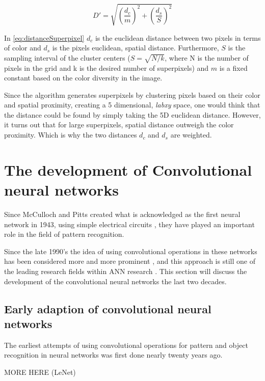 \begin{equation}
	D'=\sqrt{\left(\frac{d_{c}}{m}\right)^{2} + \left(\frac{d_{s}}{S}\right)^{2}}
	\label{eq:distanceSuperpixel}
\end{equation}

In \autoref{eq:distanceSuperpixel} $d_{c}$ is the euclidean distance between two pixels in terms of color and $d_{s}$ is the pixels euclidean, spatial distance. Furthermore, $S$ is the sampling interval of the cluster centers ($S = \sqrt{N/k}$, where N is the number of pixels in the grid and k is the desired number of superpixels) and $m$ is a fixed constant based on the color diversity in the image.

Since the algorithm generates superpixels by clustering pixels based on their color and spatial proximity, creating a 5 dimensional, \textit{labxy} space, one would think that the distance could be found by simply taking the 5D euclidean distance. However, it turns out that for large superpixels, spatial distance outweigh the color proximity. Which is why the two distances $d_{c}$ and $d_{s}$ are weighted.

\section{The development of Convolutional neural networks}
Since McCulloch and Pitts created what is acknowledged as the first neural network in 1943, using simple electrical circuits \citep{Mcculloch1990}, they have played an important role in the field of pattern recognition. 

Since the late 1990's the idea of using convolutional operations in these networks has been considered more and more prominent \citep{LeC}, and this approach is still one of the leading research fields within ANN research \citep{Wu2017}. This section will discuss the development of the convolutional neural networks the last two decades.

\subsection{Early adaption of convolutional neural networks}
The earliest attempts of using convolutional operations for pattern and object recognition in neural networks was first done nearly twenty years ago. 

MORE HERE (LeNet)


